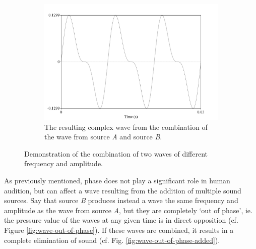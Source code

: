 \begin{figure}[h!]
\begin{center}
\begin{subfigure}{0.5\textwidth}
  \includegraphics[width=\textwidth]{figure/sound-wave-addition-combined.png}
  \caption{The resulting complex wave from the combination of the wave from source \textit{A} and source \textit{B}.}
  \label{fig:sound-wave-addition-combined}
\end{subfigure}
\end{center}
\caption{Demonstration of the combination of two waves of different frequency and amplitude.}
\label{fig:sound-wave-addition}
\end{figure}

As previously mentioned, phase does not play a significant role in human audition, but can affect a wave resulting from the addition of multiple sound sources.  Say that source \textit{B} produces instead a wave the same frequency and amplitude as the wave from source \textit{A}, but they are completely `out of phase', ie. the pressure value of the waves at any given time is in direct opposition (cf. Figure \ref{fig:wave-out-of-phase}).  If these waves are combined, it results in a complete elimination of sound (cf. Fig. \ref{fig:wave-out-of-phase-added}).

